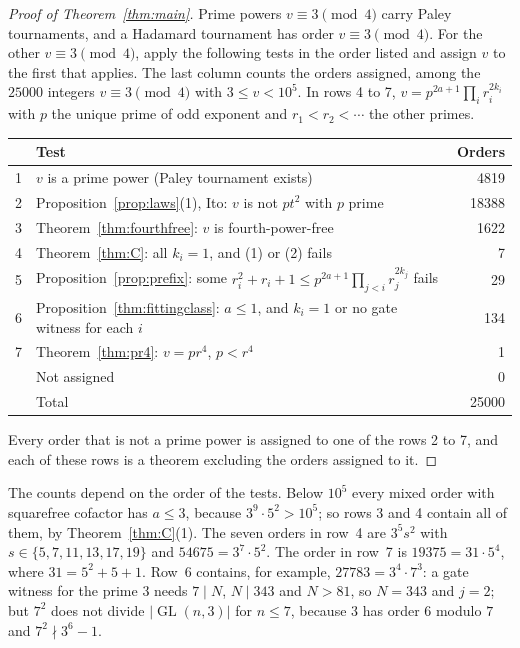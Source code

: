 \documentclass[11pt]{amsart}
\theoremstyle{definition}
\theoremstyle{remark}
\newcommand{\GL}{\operatorname{GL}}
\begin{document}
\begin{proof}[Proof of Theorem~\ref{thm:main}]
Prime powers $v\equiv3\pmod4$ carry Paley tournaments, and a Hadamard tournament has order $v\equiv3\pmod4$. For the other $v\equiv3\pmod4$, apply the following tests in the order listed and assign $v$ to the first that applies. The last column counts the orders assigned, among the $25000$ integers $v\equiv3\pmod4$ with $3\le v<10^5$. In rows 4 to 7, $v=p^{2a+1}\prod_ir_i^{2k_i}$ with $p$ the unique prime of odd exponent and $r_1<r_2<\cdots$ the other primes.

\begin{center}
\begin{tabular}{rlr}
\toprule
& Test & Orders \\
\midrule
1 & $v$ is a prime power (Paley tournament exists) & 4819 \\
2 & Proposition~\ref{prop:laws}(1), Ito: $v$ is not $pt^2$ with $p$ prime & 18388 \\
3 & Theorem~\ref{thm:fourthfree}: $v$ is fourth-power-free & 1622 \\
4 & Theorem~\ref{thm:C}: all $k_i=1$, and (1) or (2) fails & 7 \\
5 & Proposition~\ref{prop:prefix}: some $r_i^2+r_i+1\le p^{2a+1}\prod_{j<i}r_j^{2k_j}$ fails & 29 \\
6 & Proposition~\ref{thm:fittingclass}: $a\le1$, and $k_i=1$ or no gate witness for each $i$ & 134 \\
7 & Theorem~\ref{thm:pr4}: $v=pr^4$, $p<r^4$ & 1 \\
\midrule
& Not assigned & 0 \\
& Total & 25000 \\
\bottomrule
\end{tabular}
\end{center}
Every order that is not a prime power is assigned to one of the rows 2 to 7, and each of these rows is a theorem excluding the orders assigned to it.
\end{proof}

The counts depend on the order of the tests. Below $10^5$ every mixed order with squarefree cofactor has $a\le3$, because $3^9\cdot5^2>10^5$; so rows 3 and 4 contain all of them, by Theorem~\ref{thm:C}(1). The seven orders in row~4 are $3^5s^2$ with $s\in\{5,7,11,13,17,19\}$ and $54675=3^7\cdot5^2$. The order in row~7 is $19375=31\cdot5^4$, where $31=5^2+5+1$. Row~6 contains, for example, $27783=3^4\cdot7^3$: a gate witness for the prime $3$ needs $7\mid N$, $N\mid343$ and $N>81$, so $N=343$ and $j=2$; but $7^2$ does not divide $|\GL(n,3)|$ for $n\le7$, because $3$ has order $6$ modulo $7$ and $7^2\nmid3^6-1$.
\end{document}
